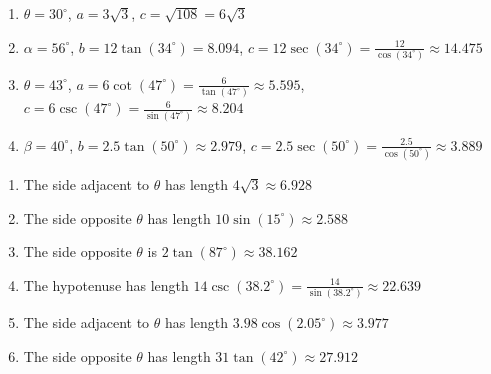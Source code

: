 \documentclass{ximera}
\begin{document}
	\author{Stitz-Zeager}


\begin{enumerate}



\item  $\theta = 30^{\circ}$, $a = 3\sqrt{3}$, $c = \sqrt{108} = 6\sqrt{3}$

\item  $\alpha = 56^{\circ}$, $b = 12 \tan(34^{\circ}) =  8.094$, $c = 12\sec(34^{\circ}) = \frac{12}{\cos(34^{\circ})} \approx 14.475$

\item  $\theta = 43^{\circ}$, $a = 6\cot(47^{\circ}) = \frac{6}{\tan(47^{\circ})} \approx 5.595$, $c = 6\csc(47^{\circ}) = \frac{6}{\sin(47^{\circ})} \approx 8.204$

\item  $\beta = 40^{\circ}$, $b = 2.5 \tan(50^{\circ}) \approx 2.979$, $c = 2.5\sec(50^{\circ}) = \frac{2.5}{\cos(50^{\circ})} \approx 3.889$

\setcounter{HW}{\value{enumi}}

\end{enumerate}

\begin{enumerate}

\setcounter{enumi}{\value{HW}}

\item  The side adjacent to $\theta$ has length $4\sqrt{3} \approx 6.928$

\item  The side opposite $\theta$ has length $10 \sin(15^{\circ}) \approx 2.588$

\item  The side opposite $\theta$ is $2\tan(87^{\circ}) \approx 38.162$

\item  The hypotenuse has length $14 \csc(38.2^{\circ}) = \frac{14}{\sin(38.2^{\circ})} \approx 22.639$

\item  The side adjacent to $\theta$ has length $3.98 \cos(2.05^{\circ}) \approx 3.977$

\item  The side opposite $\theta$ has length $31\tan(42^{\circ}) \approx 27.912$

\setcounter{HW}{\value{enumi}}

\end{enumerate}
\end{document}
